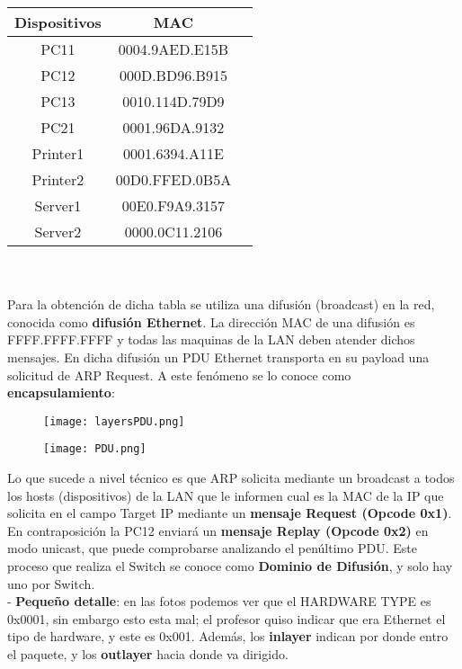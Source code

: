 \documentclass{article}
\begin{document}
\begin{tabular}{|c|c|c|}
    \hline
    Dispositivos &MAC  \\
    \hline
    PC11  &0004.9AED.E15B  \\
    \hline
    PC12  &000D.BD96.B915  \\
    \hline
    PC13  &0010.114D.79D9  \\
    \hline
    PC21  &0001.96DA.9132  \\
    \hline
    Printer1 &0001.6394.A11E \\
    \hline
    Printer2 &00D0.FFED.0B5A \\
    \hline
    Server1 &00E0.F9A9.3157 \\
    \hline
    Server2 &0000.0C11.2106 \\
    \hline
    \end{tabular} \\ \\

{\setlength{\parindent}{1pt} Para la obtención de dicha tabla se utiliza una difusión (broadcast) en la red, conocida como \textbf{difusión Ethernet}. La dirección MAC de una difusión es FFFF.FFFF.FFFF y todas las maquinas de la LAN deben atender dichos mensajes. En dicha difusión un PDU Ethernet transporta en su payload una solicitud de ARP Request. A este fenómeno se lo conoce como \textbf{encapsulamiento}: }

\begin{figure}
    \centering
    \texttt{[image: layersPDU.png]}
\end{figure}

\begin{figure}
    \centering
    \texttt{[image: PDU.png]}
\end{figure}


{\setlength{\parindent}{1pt} Lo que sucede a nivel técnico es que ARP solicita mediante un broadcast a todos los hosts (dispositivos) de la LAN que le informen cual es la MAC de la IP que solicita en el campo Target IP mediante un \textbf{mensaje Request (Opcode 0x1)}. En contraposición la PC12 enviará un \textbf{mensaje Replay (Opcode 0x2)} en modo unicast, que puede comprobarse analizando el penúltimo PDU. Este proceso que realiza el Switch se conoce como \textbf{Dominio de Difusión}, y solo hay uno por Switch.\\

- \textbf{Pequeño detalle}: en las fotos podemos ver que el HARDWARE TYPE es 0x0001, sin embargo esto esta mal; el profesor quiso indicar que era Ethernet el tipo de hardware, y este es 0x001. Además, los \textbf{inlayer} indican por donde entro el paquete, y los \textbf{outlayer} hacia donde va dirigido. }
\end{document}
